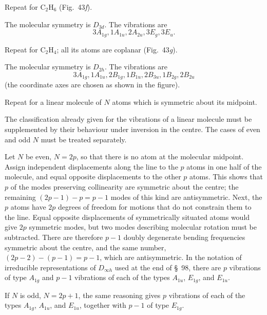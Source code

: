  Repeat for $\mathrm{C_2H_6}$ (Fig.~43\textit{f}).

\SolutionHeading The molecular symmetry is $D_{3d}$. The vibrations are
\[
3A_{1g},1A_{1u},2A_{2u},3E_g,3E_u.
\]

 Repeat for $\mathrm{C_2H_4}$; all its atoms are coplanar (Fig.~43\textit{g}).

\SolutionHeading The molecular symmetry is $D_{2h}$. The vibrations are
\[
3A_{1g},1A_{1u},2B_{1g},1B_{1u},2B_{3u},1B_{2g},2B_{2u}
\]
(the coordinate axes are chosen as shown in the figure).

 Repeat for a linear molecule of $N$ atoms which is symmetric about its midpoint.

\SolutionHeading The classification already given for the vibrations of a linear molecule must be supplemented by their behaviour under inversion in the centre. The cases of even and odd $N$ must be treated separately.

Let $N$ be even, $N=2p$, so that there is no atom at the molecular midpoint. Assign independent displacements along the line to the $p$ atoms in one half of the molecule, and equal opposite displacements to the other $p$ atoms. This shows that $p$ of the modes preserving collinearity are symmetric about the centre; the remaining $(2p-1)-p=p-1$ modes of this kind are antisymmetric. Next, the $p$ atoms have $2p$ degrees of freedom for motions that do not constrain them to the line. Equal opposite displacements of symmetrically situated atoms would give $2p$ symmetric modes, but two modes describing molecular rotation must be subtracted. There are therefore $p-1$ doubly degenerate bending frequencies symmetric about the centre, and the same number, $(2p-2)-(p-1)=p-1$, which are antisymmetric. In the notation of irreducible representations of $D_{\infty h}$ used at the end of \S~98, there are $p$ vibrations of type $A_{1g}$ and $p-1$ vibrations of each of the types $A_{1u}$, $E_{1g}$, and $E_{1u}$.

If $N$ is odd, $N=2p+1$, the same reasoning gives $p$ vibrations of each of the types $A_{1g}$, $A_{1u}$, and $E_{1u}$, together with $p-1$ of type $E_{1g}$.
